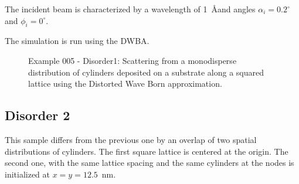 The incident beam is characterized by a wavelength of 1~\AA and angles $\alpha_i=0.2^{\circ}$ and $\phi_i=0^{\circ}$.
 
The simulation is run using the DWBA.

\begin{figure}[H]
\hfill
{}
\hfill
{}
\hfill
\caption{Example 005 - Disorder1: Scattering from a monodisperse distribution of cylinders deposited on a substrate along a squared lattice using the Distorted Wave Born approximation.}
\label{fig:PythonEx5Dis1} 
\end{figure}

\subsection{Disorder 2}
This sample differs from the previous one by an overlap of two spatial distributions of cylinders. The first square lattice is centered at the origin. The second one, with the same lattice spacing and the same cylinders at the nodes is initialized at $x=y=12.5$~nm.

